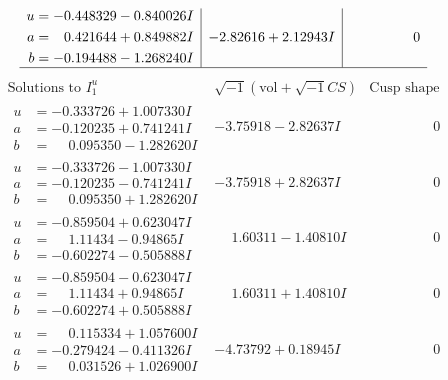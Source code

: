 \documentclass[1p]{elsarticle_modified}
\theoremstyle{definition}
\newcommand{\I}{\sqrt{-1}}
\begin{document}
$$\begin{array}{c|c|c}
\begin{aligned}
u &= -0.448329 - 0.840026 I \\
a &= \phantom{-}0.421644 + 0.849882 I \\
b &= -0.194488 - 1.268240 I\end{aligned}
 & -2.82616 + 2.12943 I & \phantom{-0.000000 } 0\\
 \hline 
 \end{array}$$\newpage$$\begin{array}{c|c|c}  
\text{Solutions to }I^u_{1}& \I (\text{vol} + \sqrt{-1}CS) & \text{Cusp shape}\\
 \hline 
\begin{aligned}
u &= -0.333726 + 1.007330 I \\
a &= -0.120235 + 0.741241 I \\
b &= \phantom{-}0.095350 - 1.282620 I\end{aligned}
 & -3.75918 - 2.82637 I & \phantom{-0.000000 } 0 \\ \hline\begin{aligned}
u &= -0.333726 - 1.007330 I \\
a &= -0.120235 - 0.741241 I \\
b &= \phantom{-}0.095350 + 1.282620 I\end{aligned}
 & -3.75918 + 2.82637 I & \phantom{-0.000000 } 0 \\ \hline\begin{aligned}
u &= -0.859504 + 0.623047 I \\
a &= \phantom{-}1.11434 - 0.94865 I \\
b &= -0.602274 - 0.505888 I\end{aligned}
 & \phantom{-}1.60311 - 1.40810 I & \phantom{-0.000000 } 0 \\ \hline\begin{aligned}
u &= -0.859504 - 0.623047 I \\
a &= \phantom{-}1.11434 + 0.94865 I \\
b &= -0.602274 + 0.505888 I\end{aligned}
 & \phantom{-}1.60311 + 1.40810 I & \phantom{-0.000000 } 0 \\ \hline\begin{aligned}
u &= \phantom{-}0.115334 + 1.057600 I \\
a &= -0.279424 - 0.411326 I \\
b &= \phantom{-}0.031526 + 1.026900 I\end{aligned}
 & -4.73792 + 0.18945 I & \phantom{-0.000000 } 0 \\ \hline\begin{aligned}

\end{aligned}
\end{array}$$
\end{document}

